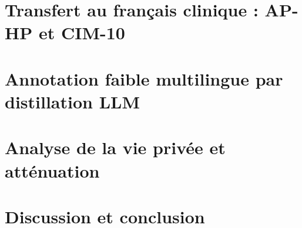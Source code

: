 \documentclass[11pt,a4paper]{article}
\begin{document}
\section{Transfert au français clinique : AP-HP et CIM-10}
\label{sec:french}


\section{Annotation faible multilingue par distillation LLM}
\label{sec:weak}


\section{Analyse de la vie privée et atténuation}
\label{sec:privacy}


\section{Discussion et conclusion}
\label{sec:conclusion}





\end{document}
